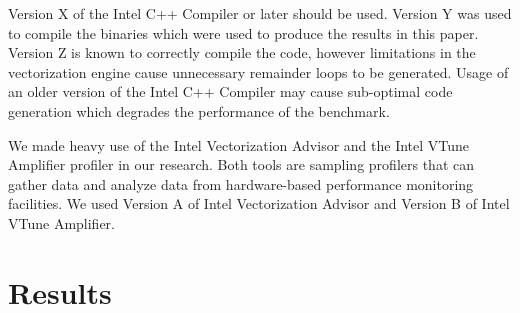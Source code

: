 \documentclass{sig-alternate-05-2015}
\begin{document}
Version X of the Intel C++ Compiler or later should be used. Version Y was used
to compile the binaries which were used to produce the results in this paper.
Version Z is known to correctly compile the code, however limitations in the
vectorization engine cause unnecessary remainder loops to be generated. Usage
of an older version of the Intel C++ Compiler may cause sub-optimal code
generation which degrades the performance of the benchmark.

We made heavy use of the Intel Vectorization Advisor and the Intel VTune
Amplifier profiler in our research. Both tools are sampling profilers that can
gather data and analyze data from hardware-based performance monitoring
facilities. We used Version A of Intel Vectorization Advisor and Version B of
Intel VTune Amplifier.

\section{Results}
\label{sec:results}
\end{document}

